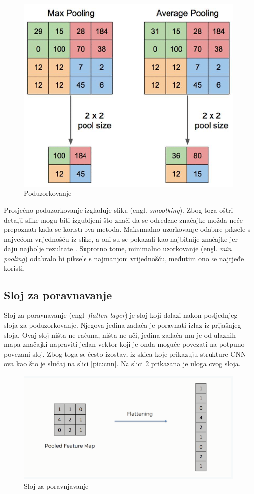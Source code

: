 \begin{figure}[htb]
    \centering
    \includegraphics[width=0.5\linewidth]{Chapters/neuronska_mreza/CNN/pooling.png} 
    \caption{Poduzorkovanje \cite{pooling1}}
    \label{pic:pooling}
\end{figure}

Prosječno poduzorkovanje izglađuje sliku (engl. \textit{smoothing}). Zbog toga oštri detalji slike
mogu biti izgubljeni što znači da se određene značajke možda neće prepoznati kada se 
koristi ova metoda. Maksimalno uzorkovanje odabire piksele s najvećom vrijednošću iz slike,
a oni su se pokazali kao najbitnije značajke jer daju najbolje rezultate \cite{cnn_whatis}.
Suprotno tome, minimalno uzorkovanje (engl. \textit{min pooling}) odabralo bi piksele s najmanjom
vrijednošću, međutim ono se najrjeđe koristi.

\subsection{Sloj za poravnavanje}
\label{sub:flat}
Sloj za poravnavanje (engl. \textit{flatten layer}) je sloj koji dolazi nakon posljednjeg sloja
za poduzorkovanje. Njegova jedina zadaća je poravnati izlaz iz prijašnjeg sloja.
Ovaj sloj ništa ne računa, ništa ne uči, jedina zadaća mu je od ulaznih mapa značajki
napraviti jedan vektor koji je onda moguće povezati na potpuno povezani sloj. Zbog
toga se često izostavi iz skica koje prikazuju strukture CNN-ova kao što je slučaj
na slici \ref{pic:cnn}. Na slici \ref{pic:flatten} prikazana je uloga ovog sloja.

\begin{figure}[htb]
    \centering
    \includegraphics[width=0.5\linewidth]{Chapters/neuronska_mreza/CNN/flatten.png} 
    \caption{Sloj za poravnjavanje \cite{flatten}}
    \label{pic:flatten}
\end{figure}


